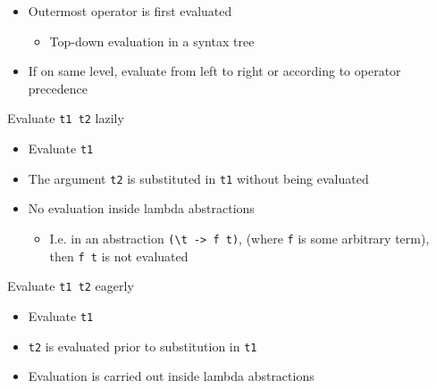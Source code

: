 \begin{itemize}
\begin{itemize}
        \end{itemize}
        \begin{itemize}
            \item Outermost operator is first evaluated
                \begin{itemize}
                    \item Top-down evaluation in a syntax tree
                \end{itemize}
            \item If on same level, evaluate from left to right or according to operator precedence
        \end{itemize}
     Evaluate \verb+t1 t2+ lazily
        \begin{itemize}
            \item Evaluate \verb+t1+
            \item The argument \verb+t2+ is substituted in \verb+t1+ without being evaluated
            \item No evaluation inside lambda abstractions
                \begin{itemize}
                    \item I.e. in an abstraction \verb+(\t -> f t)+, (where \verb+f+ is some arbitrary term), then \verb+f t+ is not evaluated
                \end{itemize}
        \end{itemize}
     Evaluate \verb+t1 t2+ eagerly
        \begin{itemize}
            \item Evaluate \verb+t1+
            \item \verb+t2+ is evaluated prior to substitution in \verb+t1+
            \item Evaluation is carried out inside lambda abstractions
        \end{itemize}
\end{itemize}


